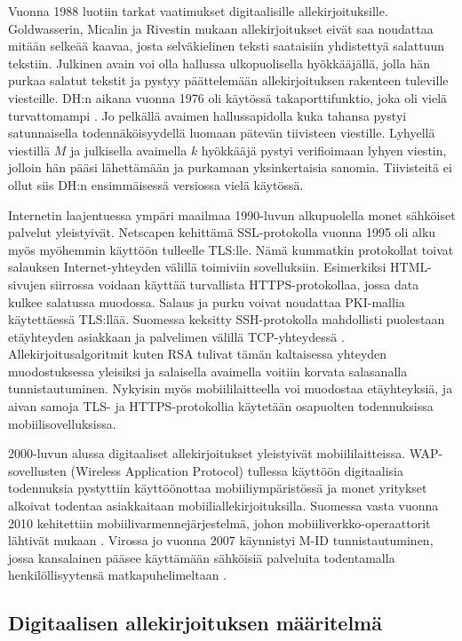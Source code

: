 \documentclass[finnish]{tktltiki2}
\theoremstyle{definition}
\theoremstyle{remark}
\begin{document}
Vuonna 1988 luotiin tarkat vaatimukset digitaalisille allekirjoituksille. Goldwasserin, Micalin ja Rivestin \cite{siam} mukaan allekirjoitukset eivät saa noudattaa mitään selkeää kaavaa, josta selväkielinen teksti saataisiin yhdistettyä salattuun tekstiin. Julkinen avain voi olla hallussa ulkopuolisella hyökkääjällä, jolla hän purkaa salatut tekstit ja pystyy päättelemään allekirjoituksen rakenteen tuleville viesteille. DH:n aikana vuonna 1976 oli käytössä takaporttifunktio, joka oli vielä turvattomampi \cite{dh76}. Jo pelkällä avaimen hallussapidolla kuka tahansa pystyi satunnaisella todennäköisyydellä luomaan pätevän tiivisteen viestille. Lyhyellä viestillä $M$ ja julkisella avaimella $k$ hyökkääjä pystyi verifioimaan lyhyen viestin, jolloin hän pääsi lähettämään ja purkamaan yksinkertaisia sanomia. Tiivisteitä ei ollut siis DH:n ensimmäisessä versiossa vielä käytössä.

Internetin laajentuessa ympäri maailmaa 1990-luvun alkupuolella monet sähköiset palvelut yleistyivät. Netscapen kehittämä SSL-protokolla vuonna 1995 oli alku myös myöhemmin käyttöön tulleelle TLS:lle. Nämä kummatkin protokollat toivat salauksen Internet-yhteyden välillä toimiviin sovelluksiin. Esimerkiksi HTML-sivujen siirrossa voidaan käyttää turvallista HTTPS-protokollaa, jossa data kulkee salatussa muodossa. Salaus ja purku voivat noudattaa PKI-mallia käytettäessä TLS:llää. Suomessa keksitty SSH-protokolla mahdollisti puolestaan etäyhteyden asiakkaan ja palvelimen välillä TCP-yhteydessä \cite{bulk}. Allekirjoitusalgoritmit kuten RSA tulivat tämän kaltaisessa yhteyden muodostuksessa yleisiksi ja salaisella avaimella voitiin korvata salasanalla tunnistautuminen. Nykyisin myös mobiililaitteella voi muodostaa etäyhteyksiä, ja aivan samoja TLS- ja HTTPS-protokollia käytetään osapuolten todennuksissa mobiilisovelluksissa.

2000-luvun alussa digitaaliset allekirjoitukset yleistyivät mobiililaitteissa. WAP-sovellusten (Wireless Application Protocol) tullessa käyttöön digitaalisia todennuksia pystyttiin käyttöönottaa mobiiliympäristössä ja monet yritykset alkoivat todentaa asiakkaitaan mobiiliallekirjoituksilla. Suomessa vasta vuonna 2010 kehitettiin mobiilivarmennejärjestelmä, johon mobiiliverkko-operaattorit lähtivät mukaan \cite{mobiva}. Virossa jo vuonna 2007 käynnistyi M-ID tunnistautuminen, jossa kansalainen pääsee käyttämään sähköisiä palveluita todentamalla henkilöllisyytensä matkapuhelimeltaan \cite{estonia}. 


\subsection{Digitaalisen allekirjoituksen määritelmä}
\end{document}
